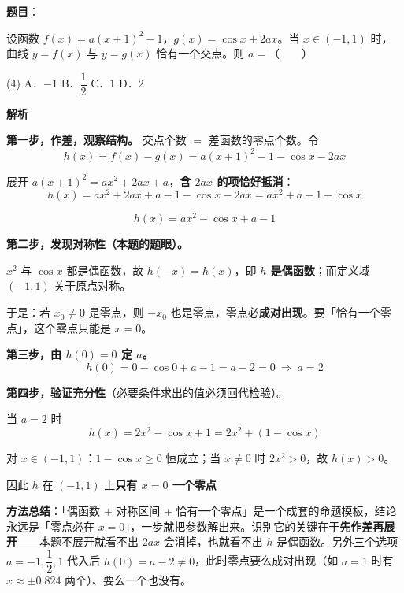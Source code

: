 \begin{answer}

\textbf{题目}：

设函数 $f(x)=a(x+1)^{2}-1$，$g(x)=\cos x+2ax$。当 $x\in(-1,1)$ 时，曲线 $y=f(x)$ 与 $y=g(x)$ 恰有一个交点。则 $a=$\mbox{（　　）}

\begin{gkopts}(4)
\task A．$-1$
\task B．$\dfrac12$
\task C．$1$
\task D．$2$
\end{gkopts}

\textbf{解析}

\textbf{第一步，作差，观察结构。} 交点个数 $=$ 差函数的零点个数。令
\nopagebreak[4]
\[h(x)=f(x)-g(x)=a(x+1)^{2}-1-\cos x-2ax\]

展开 $a(x+1)^{2}=ax^{2}+2ax+a$，\textbf{含 $2ax$ 的项恰好抵消}：
\nopagebreak[4]
\[h(x)=ax^{2}+2ax+a-1-\cos x-2ax=ax^{2}+a-1-\cos x\]

\nopagebreak[4]
\[\boxed{h(x)=ax^{2}-\cos x+a-1}\]

\textbf{第二步，发现对称性（本题的题眼）。}

$x^{2}$ 与 $\cos x$ 都是偶函数，故 $h(-x)=h(x)$，即 \textbf{$h$ 是偶函数}；而定义域 $(-1,1)$ 关于原点对称。

于是：若 $x_0\ne0$ 是零点，则 $-x_0$ 也是零点，零点必\textbf{成对出现}。要「恰有一个零点」，这个零点只能是 $x=0$。

\textbf{第三步，由 $h(0)=0$ 定 $a$。}
\nopagebreak[4]
\[h(0)=0-\cos0+a-1=a-2=0\ \Longrightarrow\ a=2\]

\textbf{第四步，验证充分性}（必要条件求出的值必须回代检验）。

当 $a=2$ 时
\nopagebreak[4]
\[h(x)=2x^{2}-\cos x+1=2x^{2}+(1-\cos x)\]

对 $x\in(-1,1)$：$1-\cos x\ge0$ 恒成立；当 $x\ne0$ 时 $2x^{2}>0$，故 $h(x)>0$。

因此 $h$ 在 $(-1,1)$ 上\textbf{只有 $x=0$ 一个零点} 

\begin{gktip}
\textbf{方法总结}：「偶函数 + 对称区间 + 恰有一个零点」是一个成套的命题模板，结论永远是「零点必在 $x=0$」，一步就把参数解出来。识别它的关键在于\textbf{先作差再展开}——本题不展开就看不出 $2ax$ 会消掉，也就看不出 $h$ 是偶函数。另外三个选项 $a=-1,\dfrac12,1$ 代入后 $h(0)=a-2\ne0$，此时零点要么成对出现（如 $a=1$ 时有 $x\approx\pm0.824$ 两个）、要么一个也没有。
\end{gktip}


\par\medskip

\end{answer}
